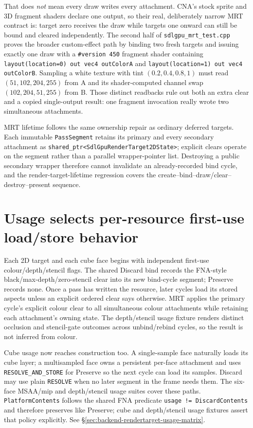 That does \emph{not} mean every draw writes every attachment. CNA's stock sprite and 3D fragment
shaders declare one output, so their real, deliberately narrow MRT contract is: target zero
receives the draw while targets one onward can still be bound and cleared independently. The
second half of \texttt{sdlgpu\_mrt\_test.cpp} proves the broader custom-effect path by binding
two fresh targets and issuing exactly one  draw with a \texttt{\#version
450} fragment shader containing \texttt{layout(location=0) out vec4 outColorA} and
\texttt{layout(location=1) out vec4 outColorB}. Sampling a white texture with tint
\((0.2,0.4,0.8,1)\) must read \((51,102,204,255)\) from A and its shader-computed channel swap
\((102,204,51,255)\) from B. Those distinct readbacks rule out both an extra clear and a copied
single-output result: one fragment invocation really wrote two simultaneous attachments.

MRT lifetime follows the same ownership repair as ordinary deferred targets. Each immutable
\texttt{PassSegment} retains its primary and every secondary attachment as
\texttt{shared\_ptr<\allowbreak{}SdlGpuRenderTarget2DState>}; explicit clears operate on the segment rather
than a parallel wrapper-pointer list. Destroying a public secondary wrapper therefore cannot
invalidate an already-recorded bind cycle, and the render-target-lifetime regression covers the
create--bind--draw/clear--destroy--present sequence.

\section{Usage selects per-resource first-use load/store behavior}

Each 2D target and each cube face begins with independent first-use colour/depth/stencil flags.
The shared Discard bind records the FNA-style black/max-depth/zero-stencil clear into its new
bind-cycle segment; Preserve records none. Once a pass has written the resource, later cycles
load its stored aspects unless an explicit ordered clear says otherwise. MRT applies the
primary cycle's explicit colour clear to all simultaneous colour attachments while retaining
each attachment's owning state. The depth/stencil usage fixture renders distinct occlusion and
stencil-gate outcomes across unbind/rebind cycles, so the result is not inferred from colour.

Cube usage now reaches construction too. A single-sample face naturally loads its cube layer;
a multisampled face owns a persistent per-face attachment and uses
\texttt{RESOLVE\_AND\_STORE} for Preserve so the next cycle can load its samples. Discard may
use plain \texttt{RESOLVE} when no later segment in the frame needs them. The six-face MSAA/mip
and depth/stencil usage suites cover these paths. \texttt{PlatformContents} follows the shared
FNA predicate \texttt{usage != DiscardContents} and therefore preserves like Preserve; cube
and depth/stencil usage fixtures assert that policy explicitly. See
\S\ref{sec:backend-rendertarget-usage-matrix}.

